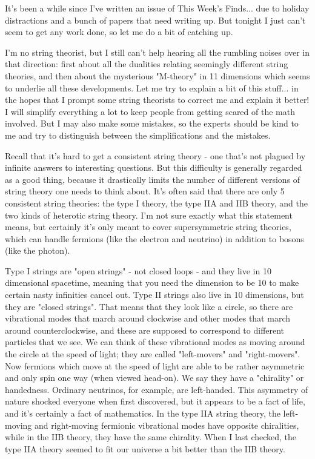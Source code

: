 



It's been a while since I've written an issue of This Week's Finds...
due to holiday distractions and a bunch of papers that need writing up.
But tonight I just can't seem to get any work done, so let me do a bit
of catching up.

I'm no string theorist, but I still can't help hearing all the rumbling
noises over in that direction: first about all the dualities relating
seemingly different string theories, and then about the mysterious
"M-theory" in 11 dimensions which seems to underlie all these
developments.  Let me try to explain a bit of this stuff... in the hopes
that I prompt some string theorists to correct me and explain it better!
I will simplify everything a lot to keep people from getting scared of
the math involved.  But I may also make some mistakes, so the experts
should be kind to me and try to distinguish between the simplifications
and the mistakes.

Recall that it's hard to get a consistent string theory - one that's
not plagued by infinite answers to interesting questions.  But this
difficulty is generally regarded as a good thing, because it drastically
limits the number of different versions of string theory one needs to
think about.  It's often said that there are only 5 consistent string
theories: the type I theory, the type IIA and IIB theory, and the two kinds
of heterotic string theory.  I'm not sure exactly what this statement
means, but certainly it's only meant to cover supersymmetric string
theories, which can handle fermions (like the electron and neutrino)
in addition to bosons (like the photon).  

Type I strings are "open strings" - not closed loops - and they live
in 10 dimensional spacetime, meaning that you need the dimension to be
10 to make certain nasty infinities cancel out.  Type II strings also
live in 10 dimensions, but they are "closed strings".  That means that
they look like a circle, so there are vibrational modes that march
around clockwise and other modes that march around counterclockwise, and
these are supposed to correspond to different particles that we see.  We
can think of these vibrational modes as moving around the circle at the
speed of light; they are called "left-movers" and "right-movers".  Now
fermions which move at the speed of light are able to be rather
asymmetric and only spin one way (when viewed head-on).  We say they
have a "chirality" or handedness.  Ordinary neutrinos, for example, are
left-handed.  This asymmetry of nature shocked everyone when first
discovered, but it appears to be a fact of life, and it's certainly a
fact of mathematics.  In the type IIA string theory, the left-moving
and right-moving fermionic vibrational modes have opposite chiralities,
while in the IIB theory, they have the same chirality.  When I last
checked, the type IIA theory seemed to fit our universe a bit better than
the IIB theory.

